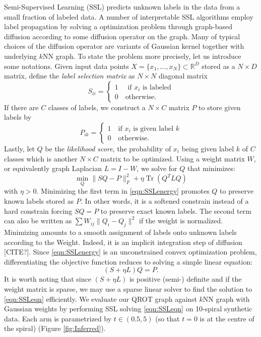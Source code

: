 \documentclass{article}
\newcommand{\R}{\mathbb{R}}
\begin{document}
Semi-Supervised Learning (SSL) predicts unknown labels in the data from a small fraction of labeled data. 
A number of interpretable SSL algorithms employ label propagation by solving a optimization problem through graph-based diffusion according to some diffusion operator on the graph. 
Many of typical choices of the diffusion operator are variants of Gaussian kernel together with underlying $k$NN graph. 
To state the problem more precisely, let us introduce some notations.
Given input data points $X = \{x_1, \ldots, x_N\} \subset \R^D$ stored as a $N\times D$ matrix, define the \textit{label selection matrix} as $N\times N$ diagonal matrix
\begin{equation}
    S_{ii} =  
    \begin{cases}
        1 \quad\text{ if $x_i$ is labeled} \\
        0 \quad\text{otherwise.}
    \end{cases}
\end{equation}
If there are $C$ classes of labels, we construct a $N\times C$ matrix $P$ to store given labels by
\begin{equation}
    P_{ik} = 
    \begin{cases}
        1 \quad \text{if $x_i$ is given label $k$}\\
        0 \quad\text{otherwise.}
    \end{cases}
\end{equation}
Lastly, let $Q$ be the \textit{likelihood score}, the probability of $x_i$ being given label $k$ of $C$ classes which is another $N\times C$ matrix to be optimized. 
Using a weight matrix $W$, or equivalently graph Laplacian $L = I -W$, we solve for $Q$ that minimizes:
\begin{equation}\label{eqn:SSLenergy}
    \min_Q \|SQ-P\|_F^2 + \eta\operatorname{Tr}\left(Q^T L Q\right)
\end{equation}
with $\eta>0.$
Minimizing the first term in \eqref{eqn:SSLenergy} promotes $Q$ to preserve known labels stored as $P.$
In other words, it is a softened constrain instead of a hard constrain forcing $SQ = P$ to preserve exact known labels.
The second term can also be written as $\sum W_{ij} \|Q_i - Q_j\|^2$ if the weight is normalized. 
Minimizing amounts to a smooth assignment of labels onto unknown labels according to the Weight.
Indeed, it is an implicit integration step of diffusion [CITE?].
Since \eqref{eqn:SSLenergy} is an unconstrained convex optimization problem, differentiating the objective function reduces to solving a simple linear equation:
\begin{equation}\label{eqn:SSLeqn}
    \left(S + \eta L\right) Q = P.
\end{equation}
It is worth noting that since $\left(S + \eta L\right)$ is positive (semi-) definite and if the weight matrix is sparse, we may use a sparse linear solver to find the solution to \eqref{eqn:SSLeqn} efficiently. 
We evaluate our QROT graph against $k$NN graph with Gaussian weights by performing SSL solving \eqref{eqn:SSLeqn} on 10-spiral synthetic data.
Each arm is parametrized by $t\in (0.5, 5)$ (so that $t=0$ is at the centre of the spiral) (Figure  \ref{fig:Inferred}). 
\end{document}

